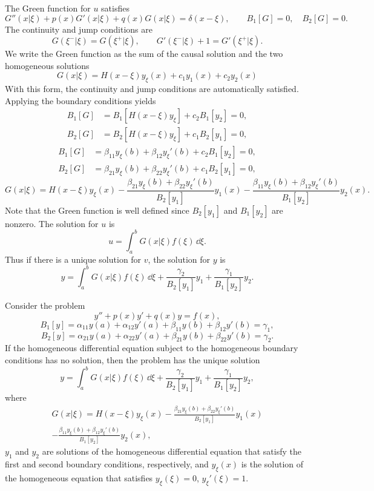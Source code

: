 The Green function for $u$ satisfies
\[
G''(x|\xi) + p(x) G'(x|\xi) + q(x) G(x|\xi) = \delta(x-\xi), \qquad
B_1[G] = 0, \quad B_2[G] = 0.
\]
The continuity and jump conditions are
\[
G(\xi^-|\xi) = G(\xi^+|\xi), \qquad G'(\xi^-|\xi) + 1 = G'(\xi^+|\xi).
\]
We write the Green function as the sum of the causal
solution and the two homogeneous solutions
\[
G(x|\xi) = H(x-\xi) y_\xi(x) + c_1 y_1(x) + c_2 y_2(x)
\]
With this form, the continuity and jump conditions are automatically 
satisfied.  Applying the boundary conditions yields
\begin{align*}
  B_1[G] &= B_1[H(x-\xi)y_\xi] + c_2 B_1[y_2] = 0, \\
  B_2[G] &= B_2[H(x-\xi)y_\xi] + c_1 B_2[y_1] = 0,
\end{align*}
\begin{align*}
  B_1[G] &= \beta_{11} y_\xi(b) + \beta_{12} y_\xi'(b) + c_2 B_1[y_2] = 0, \\
  B_2[G] &= \beta_{21} y_\xi(b) + \beta_{22} y_\xi'(b) + c_1 B_2[y_1] = 0,
\end{align*}
\[
G(x|\xi) = H(x-\xi) y_\xi(x) 
- \frac{\beta_{21} y_\xi(b) + \beta_{22} y_\xi'(b)}{B_2[y_1]} y_1(x) 
- \frac{\beta_{11} y_\xi(b) + \beta_{12} y_\xi'(b)}{B_1[y_2]} y_2(x).
\]
Note that the Green function is well defined since $B_2[y_1]$ and 
$B_1[y_2]$ are nonzero.  The solution for $u$ is
\[
u = \int_a^b G(x|\xi) f(\xi) \,\dd \xi.
\]
Thus if there is a unique solution for $v$, the solution for $y$ is
\[
y = \int_a^b G(x|\xi) f(\xi) \,\dd \xi + \frac{\gamma_2}{B_2[y_1]} y_1 
+ \frac{\gamma_1}{B_1[y_2]} y_2.
\]




\begin{Result}
  Consider the problem
  \[
  y'' + p(x) y' + q(x) y = f(x), 
  \]
  \[
  B_1[y] = \alpha_{11} y(a) + \alpha_{12} y'(a)
  + \beta_{11} y(b) + \beta_{12} y'(b) = \gamma_1, 
  \]
  \[
  B_2[y] = \alpha_{21} y(a) + \alpha_{22} y'(a)
  + \beta_{21} y(b) + \beta_{22} y'(b) = \gamma_2.
  \]
  If the homogeneous differential equation subject to the homogeneous 
  boundary conditions has no solution, then the problem has 
  the unique solution
  \[
  y = \int_a^b G(x|\xi) f(\xi) \,\dd \xi + \frac{\gamma_2}{B_2[y_1]} y_1
  + \frac{\gamma_1}{B_1[y_2]} y_2,
  \]
  where 
  \begin{multline*}
    G(x|\xi) = H(x-\xi) y_\xi(x)
    - \frac{\beta_{21} y_\xi(b) + \beta_{22} y_\xi'(b)}{B_2[y_1]} y_1(x) \\
    - \frac{\beta_{11} y_\xi(b) + \beta_{12} y_\xi'(b)}{B_1[y_2]} y_2(x),
  \end{multline*}
  $y_1$ and $y_2$ are solutions of the homogeneous differential equation that
  satisfy the first and second boundary conditions, respectively, and 
  $y_\xi(x)$ is the solution of the homogeneous equation that satisfies
  $y_\xi(\xi) = 0$, $y_\xi'(\xi) = 1$.
\end{Result}




